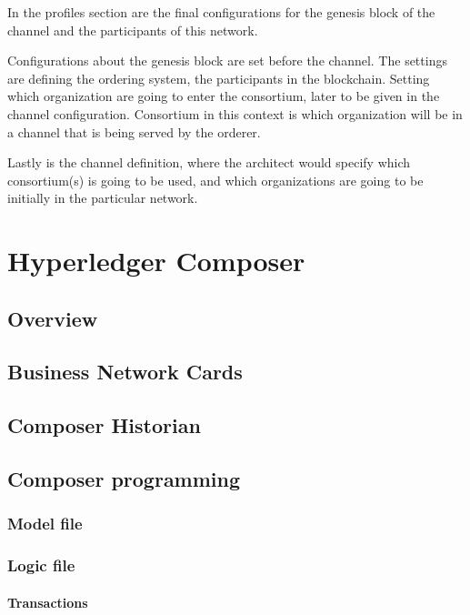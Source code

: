 \documentclass[a4paper,11pt]{report}
\begin{document}
In the profiles section are the final configurations for the genesis block of the channel and the participants of this network. 

Configurations about the genesis block are set before the channel. The settings are defining the ordering system, the participants in the blockchain. Setting which organization are going to enter the consortium, later to be given in the channel configuration. Consortium in this context is which organization will be in a channel that is being served by the orderer. 

Lastly is the channel definition, where the architect would specify which consortium(s) is going to be used, and which organizations are going to be initially in the particular network.

 

\chapter{Hyperledger Composer}
\label{hplComposer}

\section{Overview}

\section{Business Network Cards}

\section{Composer Historian}

\section{Composer programming}

\subsection{Model file}
\subsection{Logic file}
\subsubsection{Transactions}
\end{document}
